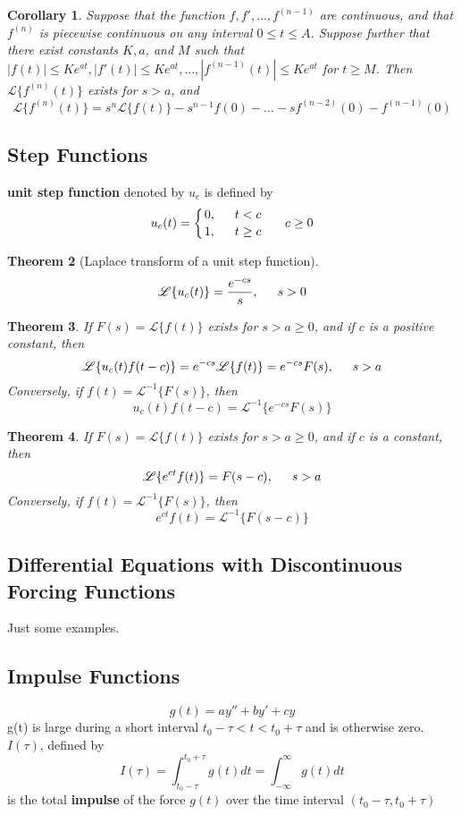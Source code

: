 \documentclass[letter]{article}
\newcommand{\laplace}[1]{\mathscr{L}\{#1\}}
\newcommand{\ilaplace}[1]{\mathscr{L}^{-1}\{#1\}}
\newcommand{\fracnoline}[2]{\genfrac{}{}{0pt}{}{#1}{#2}}
\newtheorem{theorem}{Theorem}[section]
\newtheorem{corollary}[theorem]{Corollary}
\newenvironment{definition}[1][Definition]{\begin{trivlist}
\item[\hskip \labelsep {\bfseries #1}]}{\end{trivlist}}
\begin{document}
\begin{corollary}
Suppose that the function $f, f', \ldots, f^{(n-1)}$ are continuous, and that $f^{(n)}$ is piecewise continuous on any interval $0\leq t \leq A$.  Suppose further that there exist constants $K, a$, and $M$ such that $|f(t)| \leq Ke^{at},|f'(t)| \leq Ke^{at},\ldots,|f^{(n-1)}(t)| \leq Ke^{at}$ for $t\geq M$. Then $\laplace{f^{(n)}(t)}$ exists for $s>a$, and
\[
\laplace{f^{(n)}(t)} = s^n \laplace{f(t)} - s^{n-1} f(0) - \ldots -  s f^{(n-2)}(0) - f^{(n-1)}(0)
\]
\end{corollary}

\subsection{Step Functions}
\begin{definition}
\textbf{unit step function} denoted by $u_c$ is defined by 
\[
u_c(t) = \left\{
\fracnoline{0, \indent t<c}
{1, \indent t\geq c} \right. \indent c\geq 0
\]
\end{definition}

\begin{theorem}[Laplace transform of a unit step function]
\[\laplace{u_c(t)} = \frac{e^{-cs}}{s},\indent s>0\]
\end{theorem}

\begin{theorem}
If $F(s) = \laplace{f(t)}$ exists for $s>a\geq 0$, and if $c$ is a positive constant, then
\[
\laplace{u_c(t) f(t-c)} = e^{-cs}\laplace{f(t)} = e^{-cs}F(s), \indent s>a
\]
Conversely, if $f(t) = \ilaplace{F(s)}$, then
\[
u_c(t)f(t-c) =  \ilaplace{e^{-cs}F(s)}
\]
\end{theorem}

\begin{theorem}
If $F(s) = \laplace{f(t)}$ exists for $s>a\geq 0$, and if $c$ is a constant, then
\[
\laplace{e^{ct} f(t)} =F(s-c), \indent s>a
\]
Conversely, if $f(t) = \ilaplace{F(s)}$, then
\[
e^{ct} f(t) =  \ilaplace{F(s-c)}
\]
\end{theorem}

\subsection{Differential Equations with Discontinuous Forcing Functions}
Just some examples.

\subsection{Impulse Functions}
\begin{definition}
\[  g(t) = ay'' + by'+cy \]
g(t) is large during a short interval $t_0 - \tau < t < t_0 + \tau$ and is otherwise zero.
$I(\tau)$, defined by
\[
I(\tau) = \int_{t_0-\tau}^{t_0+\tau} g(t) dt = \int_{-\infty}^\infty g(t) dt \]
is the total \textbf{impulse} of the force $g(t)$ over the time interval $(t_0-\tau, t_0+\tau)$
\end{definition}
\end{document}
